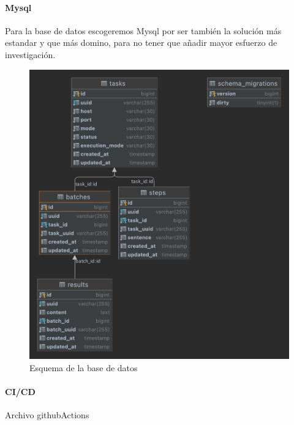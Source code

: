 \paragraph{Mysql}\label{par:mysql}
    Para la base de datos escogeremos Mysql por ser también la solución más estandar y que más domino, para no tener que añadir mayor esfuerzo de investigación.
    \begin{figure}[H]
        \centering
        \includegraphics[scale = 0.15]{part/Proyecto_ejecutivo/memoria_constructiva/dbSchema}
        \caption{Esquema de la base de datos}\label{fig:Esquema de la base de datos}
    \end{figure}
\paragraph{CI/CD}\label{par:cicd}
    Archivo githubActions